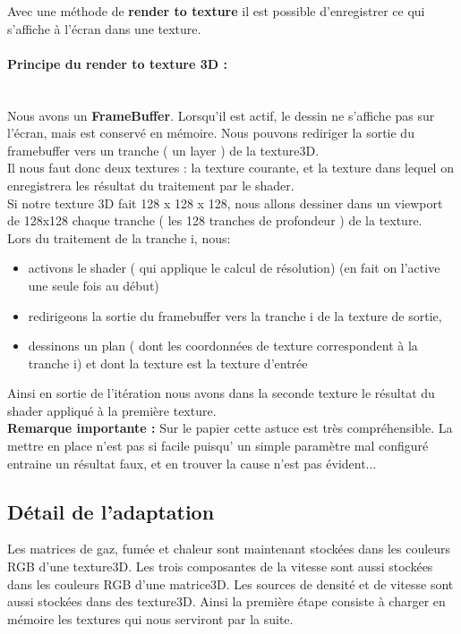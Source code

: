 \documentclass[a4paper,10pt]{article}
\begin{document}
Avec une méthode de \textbf{render to texture} il est possible
d'enregistrer ce qui s'affiche à l'écran dans une texture.\\

\paragraph*{Principe du render to texture 3D :}\\

 Nous avons un
\textbf{FrameBuffer}. Lorsqu'il est actif, le dessin ne s'affiche pas
sur l'écran, mais est conservé en mémoire. Nous pouvons rediriger la
sortie du framebuffer vers un tranche ( un layer ) de la texture3D. \\ 

Il nous faut donc deux textures : la texture courante, et la texture
dans lequel on enregistrera les résultat du traitement par le
shader.\\
 
Si notre texture 3D fait 128 x 128 x 128, nous allons dessiner dans un viewport
de 128x128 chaque tranche ( les 128 tranches de profondeur ) de la texture. \\
Lors du traitement de la tranche i, nous:\\
\begin{itemize}
\item activons le shader ( qui applique le calcul de résolution) (en
  fait on l'active une seule fois au début)\\
\item redirigeons la sortie du framebuffer vers la tranche i de la texture de sortie,\\
\item dessinons un plan ( dont les coordonnées de texture
  correspondent à la tranche i) et dont la texture est la texture
  d'entrée\\
\end{itemize}
Ainsi en sortie de l'itération nous avons dans la seconde texture le
résultat du shader appliqué à la première texture.\\
 
\textbf{Remarque importante : } Sur le papier cette astuce est très
compréhensible. La mettre en place n'est pas si facile puisqu' un
simple paramètre mal configuré entraine un résultat faux, et en trouver
la cause n'est pas évident...


\subsection{Détail de l'adaptation}
Les matrices de gaz, fumée et chaleur sont maintenant stockées dans les 
couleurs RGB d'une texture3D.
Les trois composantes de la vitesse sont aussi stockées dans les couleurs RGB 
d'une matrice3D.
Les sources de densité et de vitesse sont aussi stockées dans des texture3D.
Ainsi la première étape consiste à charger en mémoire les textures
qui nous serviront par la suite.\\
\end{document}
